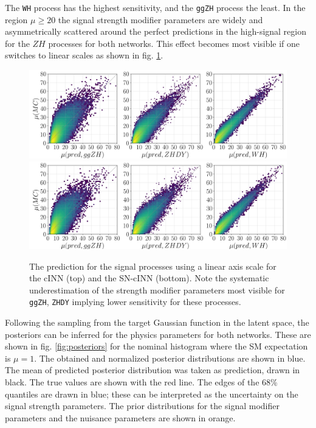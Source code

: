 The \texttt{WH} process has the highest sensitivity, and the \texttt{ggZH} process the least. In the region $\mu\geq20$ the signal strength modifier parameters are widely and asymmetrically scattered around the perfect predictions in the high-signal region for the $ZH$ processes for both networks. This effect becomes most visible if one switches to linear scales as shown in fig. \ref{fig:predictions_sig_lin}. 

\begin{figure}[h]
	\centering
	\includegraphics[width=\linewidth]{figures/inference/p_lin}
	\includegraphics[width=\linewidth]{figures/inference/p_lin_SN}
	\caption{The prediction for the signal processes using a linear axis scale for the cINN (top) and the SN-cINN (bottom). Note the systematic underestimation of the strength modifier parameters most visible for \texttt{ggZH}, \texttt{ZHDY} implying lower sensitivity for these processes.}
	\label{fig:predictions_sig_lin}
\end{figure}


Following the sampling from the target Gaussian function in the latent space, the posteriors can be inferred for the physics parameters for both networks. These are shown in fig. \ref{fig:posteriors} for the nominal histogram where the SM expectation is $\mu=1$. The obtained and normalized posterior distributions are shown in blue. The mean of predicted posterior distribution was taken as prediction, drawn in black. The true values are shown with the red line. The edges of the 68\% quantiles are drawn in blue; these can be interpreted as the uncertainty on the signal strength parameters. The prior distributions for the signal modifier parameters and the nuisance parameters are shown in orange.

